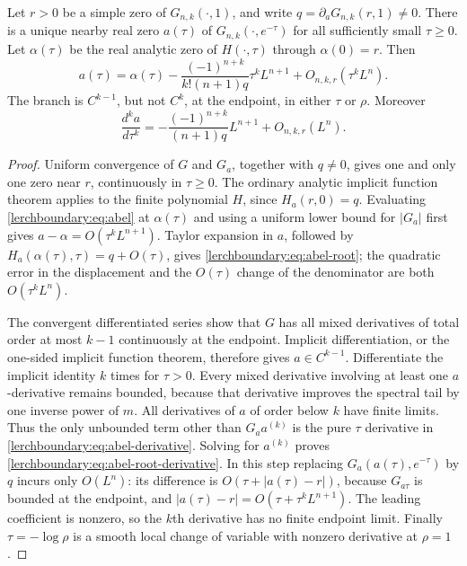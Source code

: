 \begin{theorem}
\label{lerchboundary:thm:abel-root}
Let $r>0$ be a simple zero of $G_{n,k}(\cdot,1)$, and write
$q=\partial_aG_{n,k}(r,1)\neq0$.
There is a unique nearby real zero $a(\tau)$ of
$G_{n,k}(\cdot,e^{-\tau})$ for all sufficiently small $\tau\geq0$.
Let $\alpha(\tau)$ be the real analytic zero of $H(\cdot,\tau)$
through $\alpha(0)=r$. Then
\begin{equation}\label{lerchboundary:eq:abel-root}
 a(\tau)=\alpha(\tau)
 -\frac{(-1)^{n+k}}{k!(n+1)q}\tau^k L^{n+1}
 +O_{n,k,r}(\tau^kL^n).
\end{equation}
The branch is $C^{k-1}$, but not $C^k$, at the endpoint, in either
$\tau$ or $\rho$. Moreover
\begin{equation}\label{lerchboundary:eq:abel-root-derivative}
 \frac{d^k a}{d\tau^k}
 =-\frac{(-1)^{n+k}}{(n+1)q}L^{n+1}+O_{n,k,r}(L^n).
\end{equation}
\end{theorem}

\begin{proof}
Uniform convergence of $G$ and $G_a$, together with $q\neq0$, gives
one and only one zero near $r$, continuously in $\tau\geq0$.
The ordinary analytic implicit function theorem applies to the finite
polynomial $H$, since $H_a(r,0)=q$.
Evaluating \eqref{lerchboundary:eq:abel} at $\alpha(\tau)$ and using a
uniform lower bound for $|G_a|$ first gives
$a-\alpha=O(\tau^kL^{n+1})$.  Taylor expansion in $a$, followed by
$H_a(\alpha(\tau),\tau)=q+O(\tau)$, gives
\eqref{lerchboundary:eq:abel-root}; the quadratic error in the
displacement and the $O(\tau)$ change of the denominator are both
$O(\tau^kL^n)$.

The convergent differentiated series show that $G$ has all mixed
derivatives of total order at most $k-1$ continuously at the endpoint.
Implicit differentiation, or the one-sided implicit function theorem,
therefore gives $a\in C^{k-1}$. Differentiate the implicit identity
$k$ times for $\tau>0$.  Every mixed derivative involving at least
one $a$-derivative remains bounded, because that derivative improves
the spectral tail by one inverse power of $m$. All derivatives of
$a$ of order below $k$ have finite limits. Thus the only unbounded
term other than $G_a a^{(k)}$ is the pure $\tau$ derivative in
\eqref{lerchboundary:eq:abel-derivative}. Solving for $a^{(k)}$ proves
\eqref{lerchboundary:eq:abel-root-derivative}. In this step replacing
$G_a(a(\tau),e^{-\tau})$ by $q$ incurs only $O(L^n)$:
its difference is $O(\tau+|a(\tau)-r|)$, because $G_{a\tau}$ is
bounded at the endpoint, and
$|a(\tau)-r|=O(\tau+\tau^kL^{n+1})$.
The leading coefficient is nonzero, so the $k$th derivative has no
finite endpoint limit.  Finally $\tau=-\log\rho$ is a smooth local
change of variable with nonzero derivative at $\rho=1$.
\end{proof}

